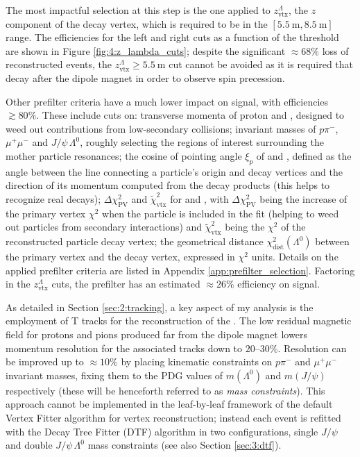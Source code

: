 The most impactful selection at this step is the one applied to $z_\text{vtx}^\Lambda$, the $z$ component of the \lambdadecay decay vertex, which is required to be in the $[\SI{5.5}{\meter}, \SI{8.5}{\meter}]$ range.
The efficiencies for the left and right cuts as a function of the threshold are shown in Figure \ref{fig:4:z_lambda_cuts};
despite the significant $\approx 68\%$ loss of reconstructed \demonstratorshort events, the $z_\text{vtx}^\Lambda \geq \SI{5.5}{\meter}$ cut cannot be avoided as it is required that \lz decay after the dipole magnet in order to observe spin precession.

Other prefilter criteria have a much lower impact on signal, with efficiencies $\gtrsim 80\%$.
These include cuts on:
transverse momenta of proton and \lz, designed to weed out contributions from low-\pt secondary collisions;
invariant masses of $p\pi^-$, $\mu^+ \mu^-$ and $J/\psi\,\Lambda^0$, roughly selecting the regions of interest surrounding the mother particle resonances;
the cosine of pointing angle $\xi_p$ of \lz and \lbz, defined as the angle between the line connecting a particle's origin and decay vertices and the direction of its momentum computed from the decay products (this helps to recognize real decays);
$\Delta \chi^2_\text{PV}$ and $\tilde{\chi}^2_\text{vtx}$ for \lbz and \lz, with $\Delta \chi^2_\text{PV}$ being the increase of the primary vertex $\chi^2$ when the particle is included in the fit (helping to weed out particles from secondary interactions) and $\tilde{\chi}^2_\text{vtx}$ being the $\chi^2$ of the reconstructed particle decay vertex;
the geometrical distance $\chi^2_\text{dist}(\Lambda^0)$ between the primary vertex and the \lz decay vertex, expressed in $\chi^2$ units.
Details on the applied prefilter criteria are listed in Appendix \ref{app:prefilter_selection}.
Factoring in the $z_\text{vtx}^\Lambda$ cuts, the prefilter has an estimated $\approx 26\%$ efficiency on \demonstratorshort signal.

As detailed in Section \ref{sec:2:tracking}, a key aspect of my analysis is the employment of T tracks for the reconstruction of the \lz.
The low residual magnetic field for protons and pions produced far from the dipole magnet lowers momentum resolution for the associated tracks down to $20$--$30\%$.
Resolution can be improved up to $\approx 10\%$ by placing kinematic constraints on $p\pi^-$ and $\mu^+ \mu^-$ invariant masses, fixing them to the PDG values of $m(\Lambda^0)$ and $m(J/\psi)$ respectively (these will be henceforth referred to as \textit{mass constraints}).
This approach cannot be implemented in the leaf-by-leaf framework of the default Vertex Fitter algorithm for vertex reconstruction;
instead each event is refitted with the Decay Tree Fitter (DTF) algorithm in two configurations, single $J/\psi$ and double $J/\psi\,\Lambda^0$ mass constraints (see also Section \ref{sec:3:dtf}).

